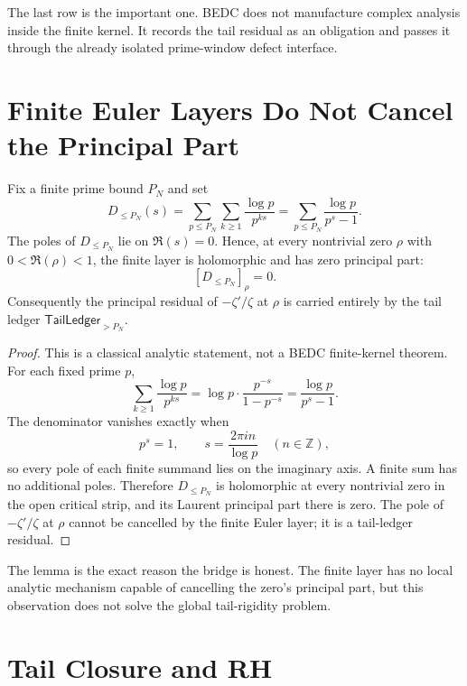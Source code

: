 The last row is the important one. BEDC does not manufacture complex analysis
inside the finite kernel. It records the tail residual as an obligation and
passes it through the already isolated prime-window defect interface.

\section{Finite Euler Layers Do Not Cancel the Principal Part}
\label{sec:rh-bedc-ant-finite-layer-no-cancellation}

\begin{lemma}
\label{lem:rh-ant-finite-euler-layer-holomorphic}
Fix a finite prime bound $P_N$ and set
$$
D_{\leq P_N}(s)
=
\sum_{p\leq P_N}\sum_{k\geq1}\frac{\log p}{p^{ks}}
=
\sum_{p\leq P_N}\frac{\log p}{p^s-1}.
$$
The poles of $D_{\leq P_N}$ lie on $\Re(s)=0$. Hence, at every nontrivial
zero $\rho$ with $0<\Re(\rho)<1$, the finite layer is holomorphic and has
zero principal part:
$$
[D_{\leq P_N}]_{\rho}=0.
$$
Consequently the principal residual of $-\zeta'/\zeta$ at $\rho$ is carried
entirely by the tail ledger $\mathsf{TailLedger}_{>P_N}$.
\end{lemma}

\begin{proof}
This is a classical analytic statement, not a BEDC finite-kernel theorem. For
each fixed prime $p$,
$$
\sum_{k\geq1}\frac{\log p}{p^{ks}}
=
\log p\cdot\frac{p^{-s}}{1-p^{-s}}
=
\frac{\log p}{p^s-1}.
$$
The denominator vanishes exactly when
$$
p^s=1,
\qquad
s=\frac{2\pi i n}{\log p}
\quad(n\in\mathbb Z),
$$
so every pole of each finite summand lies on the imaginary axis. A finite sum
has no additional poles. Therefore $D_{\leq P_N}$ is holomorphic at every
nontrivial zero in the open critical strip, and its Laurent principal part
there is zero. The pole of $-\zeta'/\zeta$ at $\rho$ cannot be cancelled by
the finite Euler layer; it is a tail-ledger residual.
\end{proof}

The lemma is the exact reason the bridge is honest. The finite layer has no
local analytic mechanism capable of cancelling the zero's principal part, but
this observation does not solve the global tail-rigidity problem.

\section{Tail Closure and RH}
\label{sec:rh-bedc-ant-tail-closure-rh}

